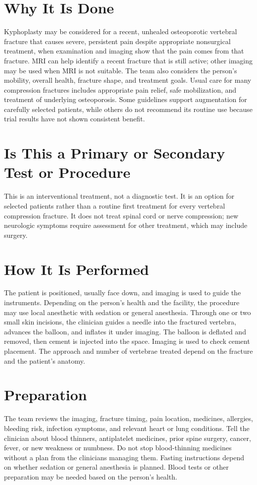 \section*{Why It Is Done}
Kyphoplasty may be considered for a recent, unhealed osteoporotic vertebral fracture that causes severe, persistent pain despite appropriate nonsurgical treatment, when examination and imaging show that the pain comes from that fracture. MRI can help identify a recent fracture that is still active; other imaging may be used when MRI is not suitable. The team also considers the person's mobility, overall health, fracture shape, and treatment goals. Usual care for many compression fractures includes appropriate pain relief, safe mobilization, and treatment of underlying osteoporosis. Some guidelines support augmentation for carefully selected patients, while others do not recommend its routine use because trial results have not shown consistent benefit.

\section*{Is This a Primary or Secondary Test or Procedure}
This is an interventional treatment, not a diagnostic test. It is an option for selected patients rather than a routine first treatment for every vertebral compression fracture. It does not treat spinal cord or nerve compression; new neurologic symptoms require assessment for other treatment, which may include surgery.

\section*{How It Is Performed}
The patient is positioned, usually face down, and imaging is used to guide the instruments. Depending on the person's health and the facility, the procedure may use local anesthetic with sedation or general anesthesia. Through one or two small skin incisions, the clinician guides a needle into the fractured vertebra, advances the balloon, and inflates it under imaging. The balloon is deflated and removed, then cement is injected into the space. Imaging is used to check cement placement. The approach and number of vertebrae treated depend on the fracture and the patient's anatomy.

\section*{Preparation}
The team reviews the imaging, fracture timing, pain location, medicines, allergies, bleeding risk, infection symptoms, and relevant heart or lung conditions. Tell the clinician about blood thinners, antiplatelet medicines, prior spine surgery, cancer, fever, or new weakness or numbness. Do not stop blood-thinning medicines without a plan from the clinicians managing them. Fasting instructions depend on whether sedation or general anesthesia is planned. Blood tests or other preparation may be needed based on the person's health.

